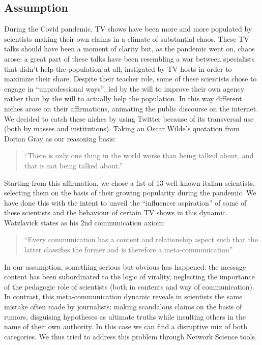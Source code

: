\documentclass[sigchi]{acmart}
\begin{document}
\subsection{Assumption}
During the Covid pandemic, TV shows have been more and more populated by scientists making their own claims in a climate of substantial chaos. These TV talks should have been a moment of clarity but, as the pandemic went on, chaos arose: a great part of these talks have been resembling a war between specialists that didn’t help the population at all, instigated by TV hosts in order to maximize their share. Despite their teacher role, some of these scientists chose to engage in “unprofessional ways”, led by the will to improve their own agency rather than by the will to actually help the population. In this way different niches arose on their affirmations, animating the public discourse on the internet. We decided to catch these niches by using Twitter because of its transversal use (both by masses and institutions). Taking an Oscar Wilde’s quotation from Dorian Gray as our reasoning basis:
\begin{quote}
    “There is only one thing in the world worse than being talked about, and that is not being talked about.”
\end{quote}
Starting from this affirmation, we chose a list of 13 well known italian scientists, selecting them on the basis of their growing popularity during the pandemic. We have done this with the intent to unveil the “influencer aspiration” of some of these scientists and the behaviour of certain TV shows in this dynamic. Watzlavick states as his 2nd communication axiom:
\begin{quote}
    “Every communication has a content and relationship aspect such that the latter classifies the former and is therefore a meta-communication”
\end{quote}
In our assumption, something serious but obvious has happened: the message content has been subordinated to the logic of virality, neglecting the importance of the pedagogic role of scientists (both in contents and way of communication). In contrast, this meta-communication dynamic reveals in scientists the same mistake often made by journalists: making scandalous claims on the basis of rumors, disguising hypotheses as ultimate truths while insulting others in the name of their own authority. In this case we can find a disruptive mix of both categories. We thus tried to address this problem through Network Science tools.
\end{document}
